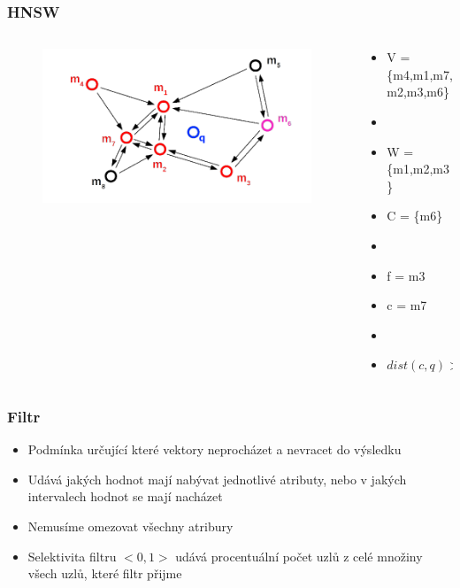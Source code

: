 \documentclass{beamer}
\begin{document}
	\begin{frame}
		\frametitle{HNSW}
		\begin{columns}[T] %
			\begin{column}{.6\textwidth}
				\begin{figure}
					\includegraphics[scale=0.3]{figures/HNSW_b11.png}
				\end{figure}
			\end{column}%
			\hfill%
			\begin{column}{.4\textwidth}
				\begin{itemize}
					\item V = \{m4,m1,m7,m2,m3,m6\}
					\item[]
					\item W = \{m1,m2,m3\}
					\item C = \{m6\}
					\item[]
					\item f = m3
					\item c = m7
					\item[]
					\item $dist(c,q) > dist(c,f)$
				\end{itemize}
			\end{column}%
		\end{columns}
	\end{frame}

	\begin{frame}
		\frametitle{Filtr}
		
		\begin{itemize}
			\item Podmínka určující které vektory neprocházet a nevracet do výsledku
			\item Udává jakých hodnot mají nabývat jednotlivé atributy, nebo v jakých intervalech hodnot se mají nacházet
			\item Nemusíme omezovat všechny atribury
			\item Selektivita filtru $<0,1>$ udává procentuální počet uzlů z celé množiny všech uzlů, které filtr přijme
			
		\end{itemize}
		
	\end{frame}
\end{document}
